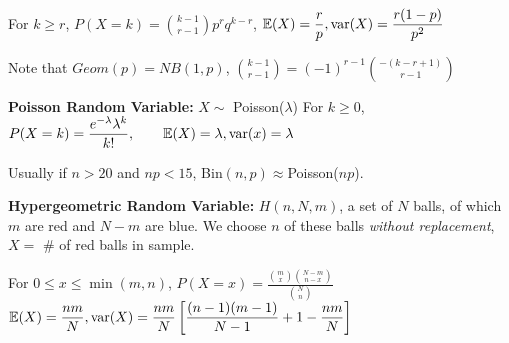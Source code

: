 \documentclass[10pt, a4paper]{article}
\newcommand{\E}{{\mathbb{E}}}
\newcommand{\var}{{\rm var}}
\newcommand{\disp}{\displaystyle}
\begin{document}
\begin{spacing}{1}
    For $k\ge r$, $\disp P(X=k)={k-1\choose r-1}p^r q^{k-r}$,
    \qquad $\E(X)=\dfrac{r}{p}, \var(X)=\dfrac{r(1-p)}{p^2}$

    Note that $Geom(p)=NB(1,p)$, $\disp {k-1\choose r-1}=(-1)^{r-1}{-(k-r+1)\choose r-1}$

    {\bf Poisson Random Variable:} $X\sim$ Poisson($\lambda$) 
    \qquad For $k\ge 0$, $\disp P(X=k)=\frac{e^{-\lambda}\lambda^k}{k!},\qquad \E(X)=\lambda, 
    \var(x)=\lambda$

    Usually if $n>20$ and $np<15$, Bin$(n,p)\approx $Poisson($np$).

    {\bf Hypergeometric Random Variable:} $H(n,N,m)$, a set of $N$ balls, 
    of which $m$ are red and $N-m$ are blue. We choose $n$ of these balls 
    {\it without replacement}, $X=$ \# of red balls in sample.

    For $0\le x\le \min(m,n)$, $\disp P(X=x)=\frac{{m\choose x}{N-m\choose n-x}}{{N\choose n}}$
    \qquad $\disp \E(X)=\dfrac{nm}{N}, \var(X)=\frac{nm}{N}
    \left[\frac{(n-1)(m-1)}{N-1}+1-\frac{nm}{N}\right]$


\end{spacing}
\end{document}
